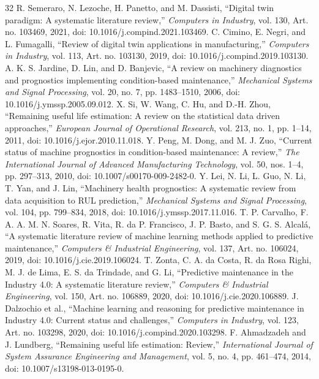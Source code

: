 ﻿\documentclass[conference]{IEEEtran}
\begin{document}
\begin{thebibliography}{32}
 R. Semeraro, N. Lezoche, H. Panetto, and M. Dassisti, ``Digital twin paradigm: A systematic literature review,'' \emph{Computers in Industry}, vol. 130, Art. no. 103469, 2021, doi: 10.1016/j.compind.2021.103469.
 C. Cimino, E. Negri, and L. Fumagalli, ``Review of digital twin applications in manufacturing,'' \emph{Computers in Industry}, vol. 113, Art. no. 103130, 2019, doi: 10.1016/j.compind.2019.103130.
 A. K. S. Jardine, D. Lin, and D. Banjevic, ``A review on machinery diagnostics and prognostics implementing condition-based maintenance,'' \emph{Mechanical Systems and Signal Processing}, vol. 20, no. 7, pp. 1483--1510, 2006, doi: 10.1016/j.ymssp.2005.09.012.
 X. Si, W. Wang, C. Hu, and D.-H. Zhou, ``Remaining useful life estimation: A review on the statistical data driven approaches,'' \emph{European Journal of Operational Research}, vol. 213, no. 1, pp. 1--14, 2011, doi: 10.1016/j.ejor.2010.11.018.
 Y. Peng, M. Dong, and M. J. Zuo, ``Current status of machine prognostics in condition-based maintenance: A review,'' \emph{The International Journal of Advanced Manufacturing Technology}, vol. 50, nos. 1--4, pp. 297--313, 2010, doi: 10.1007/s00170-009-2482-0.
 Y. Lei, N. Li, L. Guo, N. Li, T. Yan, and J. Lin, ``Machinery health prognostics: A systematic review from data acquisition to RUL prediction,'' \emph{Mechanical Systems and Signal Processing}, vol. 104, pp. 799--834, 2018, doi: 10.1016/j.ymssp.2017.11.016.
 T. P. Carvalho, F. A. A. M. N. Soares, R. Vita, R. da P. Francisco, J. P. Basto, and S. G. S. Alcal\'a, ``A systematic literature review of machine learning methods applied to predictive maintenance,'' \emph{Computers \& Industrial Engineering}, vol. 137, Art. no. 106024, 2019, doi: 10.1016/j.cie.2019.106024.
 T. Zonta, C. A. da Costa, R. da Rosa Righi, M. J. de Lima, E. S. da Trindade, and G. Li, ``Predictive maintenance in the Industry 4.0: A systematic literature review,'' \emph{Computers \& Industrial Engineering}, vol. 150, Art. no. 106889, 2020, doi: 10.1016/j.cie.2020.106889.
 J. Dalzochio et al., ``Machine learning and reasoning for predictive maintenance in Industry 4.0: Current status and challenges,'' \emph{Computers in Industry}, vol. 123, Art. no. 103298, 2020, doi: 10.1016/j.compind.2020.103298.
 F. Ahmadzadeh and J. Lundberg, ``Remaining useful life estimation: Review,'' \emph{International Journal of System Assurance Engineering and Management}, vol. 5, no. 4, pp. 461--474, 2014, doi: 10.1007/s13198-013-0195-0.

\end{thebibliography}
\end{document}
